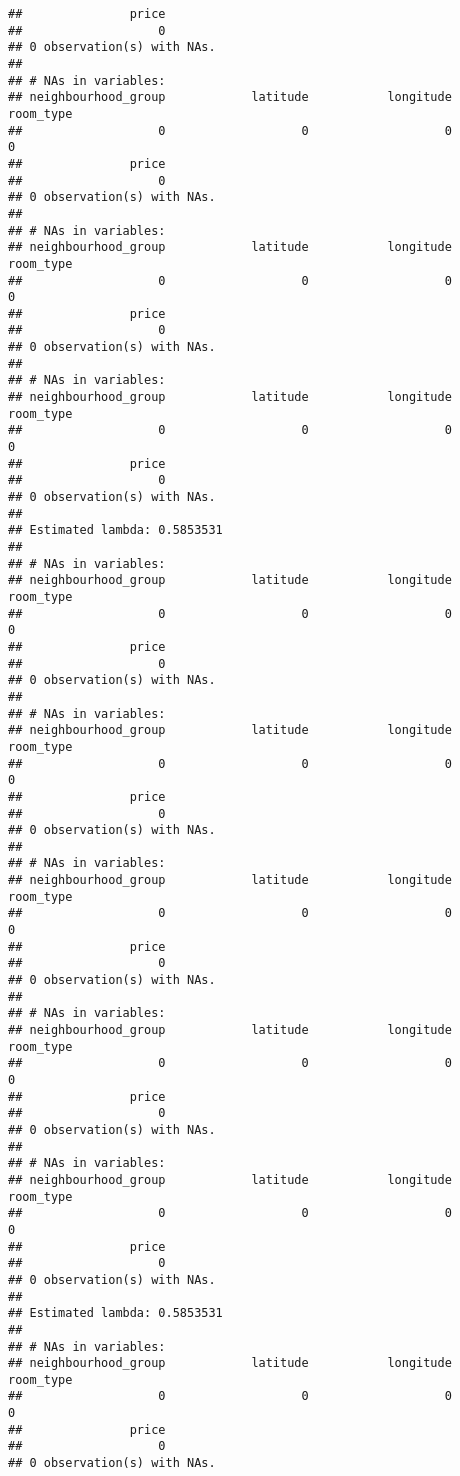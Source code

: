 \documentclass[
]{article}
\begin{document}
\begin{verbatim}
##               price 
##                   0 
## 0 observation(s) with NAs.
## 
## # NAs in variables:
## neighbourhood_group            latitude           longitude           room_type 
##                   0                   0                   0                   0 
##               price 
##                   0 
## 0 observation(s) with NAs.
## 
## # NAs in variables:
## neighbourhood_group            latitude           longitude           room_type 
##                   0                   0                   0                   0 
##               price 
##                   0 
## 0 observation(s) with NAs.
## 
## # NAs in variables:
## neighbourhood_group            latitude           longitude           room_type 
##                   0                   0                   0                   0 
##               price 
##                   0 
## 0 observation(s) with NAs.
## 
## Estimated lambda: 0.5853531 
## 
## # NAs in variables:
## neighbourhood_group            latitude           longitude           room_type 
##                   0                   0                   0                   0 
##               price 
##                   0 
## 0 observation(s) with NAs.
## 
## # NAs in variables:
## neighbourhood_group            latitude           longitude           room_type 
##                   0                   0                   0                   0 
##               price 
##                   0 
## 0 observation(s) with NAs.
## 
## # NAs in variables:
## neighbourhood_group            latitude           longitude           room_type 
##                   0                   0                   0                   0 
##               price 
##                   0 
## 0 observation(s) with NAs.
## 
## # NAs in variables:
## neighbourhood_group            latitude           longitude           room_type 
##                   0                   0                   0                   0 
##               price 
##                   0 
## 0 observation(s) with NAs.
## 
## # NAs in variables:
## neighbourhood_group            latitude           longitude           room_type 
##                   0                   0                   0                   0 
##               price 
##                   0 
## 0 observation(s) with NAs.
## 
## Estimated lambda: 0.5853531 
## 
## # NAs in variables:
## neighbourhood_group            latitude           longitude           room_type 
##                   0                   0                   0                   0 
##               price 
##                   0 
## 0 observation(s) with NAs.

\end{verbatim}
\end{document}
